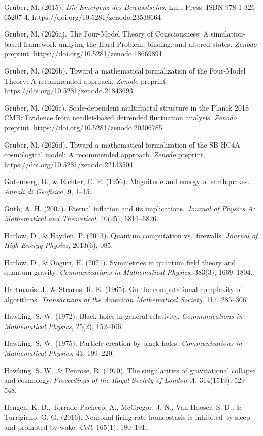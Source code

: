 \documentclass[
]{article}
\begin{document}
Gruber, M. (2015). \emph{Die Emergenz des Bewusstseins}. Lulu Press.
ISBN 978-1-326-65207-4. https://doi.org/10.5281/zenodo.23538664

Gruber, M. (2026a). The Four-Model Theory of Consciousness: A
simulation-based framework unifying the Hard Problem, binding, and
altered states. \emph{Zenodo} preprint.
https://doi.org/10.5281/zenodo.18669891

Gruber, M. (2026b). Toward a mathematical formalization of the
Four-Model Theory: A recommended approach. \emph{Zenodo} preprint.
https://doi.org/10.5281/zenodo.21843693

Gruber, M. (2026c). Scale-dependent multifractal structure in the Planck
2018 CMB: Evidence from needlet-based detrended fluctuation analysis.
\emph{Zenodo} preprint. https://doi.org/10.5281/zenodo.20306785

Gruber, M. (2026d). Toward a mathematical formalization of the SB-HC4A
cosmological model: A recommended approach. \emph{Zenodo} preprint.
https://doi.org/10.5281/zenodo.22133504

Gutenberg, B., \& Richter, C. F. (1956). Magnitude and energy of
earthquakes. \emph{Annali di Geofisica}, 9, 1--15.

Guth, A. H. (2007). Eternal inflation and its implications.
\emph{Journal of Physics A: Mathematical and Theoretical}, 40(25),
6811--6826.

Harlow, D., \& Hayden, P. (2013). Quantum computation vs.~firewalls.
\emph{Journal of High Energy Physics}, 2013(6), 085.

Harlow, D., \& Ooguri, H. (2021). Symmetries in quantum field theory and
quantum gravity. \emph{Communications in Mathematical Physics}, 383(3),
1669--1804.

Hartmanis, J., \& Stearns, R. E. (1965). On the computational complexity
of algorithms. \emph{Transactions of the American Mathematical Society},
117, 285--306.

Hawking, S. W. (1972). Black holes in general relativity.
\emph{Communications in Mathematical Physics}, 25(2), 152--166.

Hawking, S. W. (1975). Particle creation by black holes.
\emph{Communications in Mathematical Physics}, 43, 199--220.

Hawking, S. W., \& Penrose, R. (1970). The singularities of
gravitational collapse and cosmology. \emph{Proceedings of the Royal
Society of London A}, 314(1519), 529--548.

Hengen, K. B., Torrado Pacheco, A., McGregor, J. N., Van Hooser, S. D.,
\& Turrigiano, G. G. (2016). Neuronal firing rate homeostasis is
inhibited by sleep and promoted by wake. \emph{Cell}, 165(1), 180--191.
\end{document}
